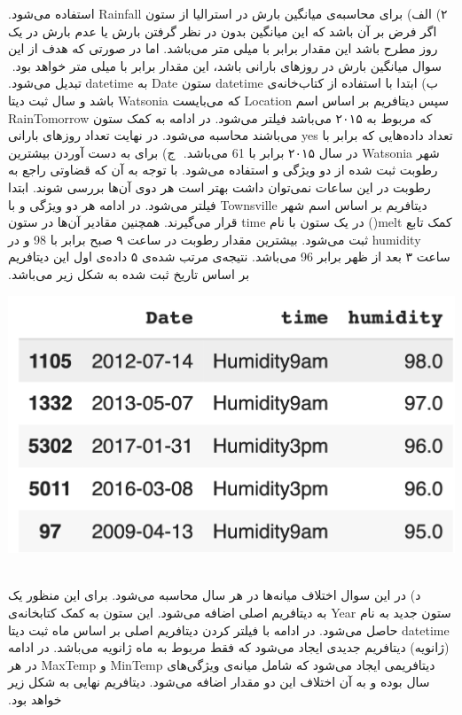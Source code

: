 ‫
‫۲) الف) برای محاسبه‌ی میانگین بارش در استرالیا از ستون Rainfall استفاده می‌شود. \newline
‫اگر فرض بر آن باشد که این میانگین بدون در نظر گرفتن بارش یا عدم بارش در یک روز مطرح باشد این مقدار برابر با \colorbox{Emerald}{} میلی متر می‌باشد. اما در صورتی که هدف از این سوال میانگین بارش در روزهای بارانی باشد، این مقدار برابر با \colorbox{Emerald}{} میلی متر خواهد بود. \newline
‫
‫ب) ابتدا با استفاده از کتاب‌خانه‌ی datetime ستون Date به datetime تبدیل می‌شود. سپس دیتافریم بر اساس اسم Location که می‌بایست Watsonia باشد و سال ثبت دیتا که مربوط به ۲۰۱۵ می‌باشد فیلتر می‌شود. در ادامه به کمک ستون RainTomorrow تعداد داده‌هایی که برابر با yes می‌باشند محاسبه می‌شود. در نهایت تعداد روزهای بارانی شهر Watsonia در سال ۲۰۱۵ برابر با \colorbox{Emerald}{61} می‌باشد. \newline
‫
‫ج) برای به دست آوردن بیشترین رطوبت ثبت شده از دو ویژگی  و  استفاده می‌شود. با توجه به آن که قضاوتی راجع به رطوبت در این ساعات نمی‌توان داشت بهتر است هر دوی آن‌ها بررسی شوند. \newline
‫ابتدا دیتافریم بر اساس اسم شهر Townsville فیلتر می‌شود. در ادامه هر دو ویژگی  و  با کمک تابع melt() در یک ستون با نام time قرار می‌گیرند. همچنین مقادیر آن‌ها در ستون humidity ثبت می‌شود. بیشترین مقدار رطوبت در ساعت ۹ صبح برابر با \colorbox{Emerald}{98} و در ساعت ۳ بعد از ظهر برابر \colorbox{Emerald}{96} می‌باشد. نتیجه‌ی مرتب شده‌ی ۵ داده‌ی اول این دیتافریم بر اساس تاریخ ثبت شده به شکل زیر می‌باشد.
‫
‫\begin{center}
‫\includegraphics[scale=0.35]{figs/df1.png}
‫\end{center}
‫
‫د) در این سوال اختلاف میانه‌ها در هر سال محاسبه می‌شود. برای این منظور یک ستون جدید به نام Year به دیتافریم اصلی اضافه می‌شود. این ستون به کمک کتابخانه‌ی datetime حاصل می‌شود. در ادامه با فیلتر کردن دیتافریم اصلی بر اساس ماه ثبت دیتا (ژانویه) دیتافریم جدیدی ایجاد می‌شود که فقط مربوط به ماه ژانویه می‌باشد. در ادامه دیتافریمی ایجاد می‌شود که شامل میانه‌ی ویژگی‌های MinTemp و MaxTemp در هر سال بوده و به آن اختلاف این دو مقدار اضافه می‌شود. دیتافریم نهایی به شکل زیر خواهد بود.
